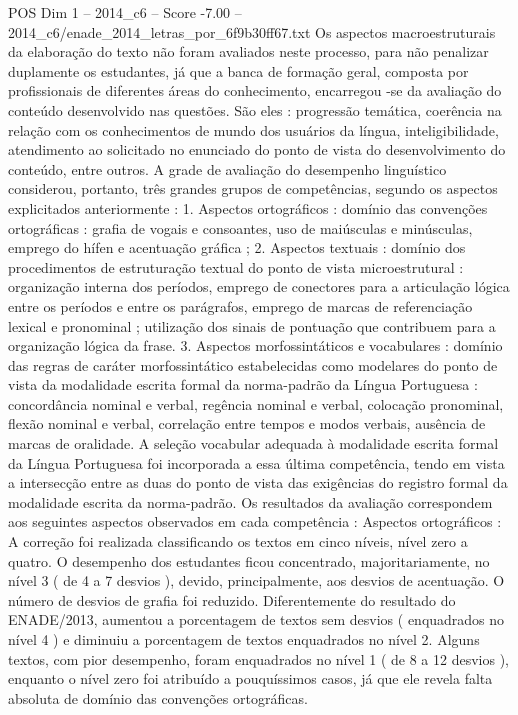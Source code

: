 \begin{textsample}{POS Dim 1 – 2014\_c6 – Score -7.00 – 2014\_c6/enade\_2014\_letras\_por\_6f9b30ff67.txt}
Os aspectos macroestruturais da elaboração do texto não foram avaliados neste processo, para não penalizar duplamente os estudantes, já que a banca de formação geral, composta por profissionais de diferentes áreas do conhecimento, encarregou -se da avaliação do conteúdo desenvolvido nas questões.
São eles : progressão temática, coerência na relação com os conhecimentos de mundo dos usuários da língua, inteligibilidade, atendimento ao solicitado no enunciado do ponto de vista do desenvolvimento do conteúdo, entre outros.
A grade de avaliação do desempenho linguístico considerou, portanto, três grandes grupos de competências, segundo os aspectos explicitados anteriormente : 1.
Aspectos ortográficos : domínio das convenções ortográficas : grafia de vogais e consoantes, uso de maiúsculas e minúsculas, emprego do hífen e acentuação gráfica ; 2.
Aspectos textuais : domínio dos procedimentos de estruturação textual do ponto de vista microestrutural : organização interna dos períodos, emprego de conectores para a articulação lógica entre os períodos e entre os parágrafos, emprego de marcas de referenciação lexical e pronominal ; utilização dos sinais de pontuação que contribuem para a organização lógica da frase. 3.
Aspectos morfossintáticos e vocabulares : domínio das regras de caráter morfossintático estabelecidas como modelares do ponto de vista da modalidade escrita formal da norma-padrão da Língua Portuguesa : concordância nominal e verbal, regência nominal e verbal, colocação pronominal, flexão nominal e verbal, correlação entre tempos e modos verbais, ausência de marcas de oralidade.
A seleção vocabular adequada à modalidade escrita formal da Língua Portuguesa foi incorporada a essa última competência, tendo em vista a intersecção entre as duas do ponto de vista das exigências do registro formal da modalidade escrita da norma-padrão.
Os resultados da avaliação correspondem aos seguintes aspectos observados em cada competência : Aspectos ortográficos : A correção foi realizada classificando os textos em cinco níveis, nível zero a quatro.
O desempenho dos estudantes ficou concentrado, majoritariamente, no nível 3 ( de 4 a 7 desvios ), devido, principalmente, aos desvios de acentuação.
O número de desvios de grafia foi reduzido.
Diferentemente do resultado do ENADE/2013, aumentou a porcentagem de textos sem desvios ( enquadrados no nível 4 ) e diminuiu a porcentagem de textos enquadrados no nível 2.
Alguns textos, com pior desempenho, foram enquadrados no nível 1 ( de 8 a 12 desvios ), enquanto o nível zero foi atribuído a pouquíssimos casos, já que ele revela falta absoluta de domínio das convenções ortográficas.

\end{textsample}
